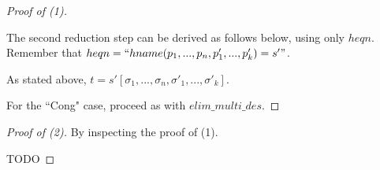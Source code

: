 \documentclass[11pt]{article} %
\begin{document}
\begin{proof}[Proof of (1)]
\begin{enumerate}
\begin{itemize}
The second reduction step can be derived as follows below, using only $heqn$. Remember that $heqn = `` hname(p_1, ..., p_n, p'_1, ..., p'_k) = s' "$.
\begin{prooftree}
\end{prooftree}

As stated above, $t = s'[\sigma_1, ..., \sigma_n, \sigma'_1, ..., \sigma'_k]$.

\end{itemize}

\end{enumerate}

For the ``Cong" case, proceed as with $elim\_multi\_des$.

\end{proof}

\begin{proof}[Proof of (2)] By inspecting the proof of (1).

TODO

\end{proof}
\end{document}
